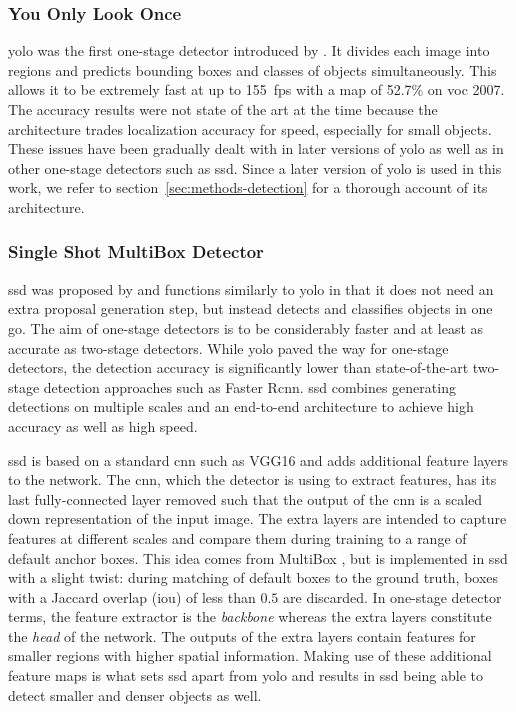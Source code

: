\documentclass[draft,final]{vutinfth} %
\begin{document}
\subsubsection{You Only Look Once}
\label{sssec:theory-yolo}

\gls{yolo} was the first one-stage detector introduced by
\textcite{redmon2016}. It divides each image into regions and predicts
bounding boxes and classes of objects simultaneously. This allows it
to be extremely fast at up to \qty{155}{fps} with a \gls{map} of
52.7\% on \gls{voc} 2007. The accuracy results were not state of the
art at the time because the architecture trades localization accuracy
for speed, especially for small objects. These issues have been
gradually dealt with in later versions of \gls{yolo} as well as in
other one-stage detectors such as \gls{ssd}. Since a later version of
\gls{yolo} is used in this work, we refer to
section~\ref{sec:methods-detection} for a thorough account of its
architecture.

\subsubsection{Single Shot MultiBox Detector}
\label{sssec:theory-ssd}

\gls{ssd} was proposed by \textcite{liu2016} and functions similarly
to \gls{yolo} in that it does not need an extra proposal generation
step, but instead detects and classifies objects in one go. The aim of
one-stage detectors is to be considerably faster and at least as
accurate as two-stage detectors. While \gls{yolo} paved the way for
one-stage detectors, the detection accuracy is significantly lower
than state-of-the-art two-stage detection approaches such as Faster
R\gls{cnn}. \gls{ssd} combines generating detections on multiple
scales and an end-to-end architecture to achieve high accuracy as well
as high speed.

\gls{ssd} is based on a standard \gls{cnn} such as VGG16
\cite{liu2015} and adds additional feature layers to the network. The
\gls{cnn}, which the detector is using to extract features, has its
last fully-connected layer removed such that the output of the
\gls{cnn} is a scaled down representation of the input image. The
extra layers are intended to capture features at different scales and
compare them during training to a range of default anchor boxes. This
idea comes from MultiBox \cite{erhan2014}, but is implemented in
\gls{ssd} with a slight twist: during matching of default boxes to the
ground truth, boxes with a Jaccard overlap (\gls{iou}) of less than
$0.5$ are discarded. In one-stage detector terms, the feature
extractor is the \emph{backbone} whereas the extra layers constitute
the \emph{head} of the network. The outputs of the extra layers
contain features for smaller regions with higher spatial
information. Making use of these additional feature maps is what sets
\gls{ssd} apart from \gls{yolo} and results in \gls{ssd} being able to
detect smaller and denser objects as well.
\end{document}
